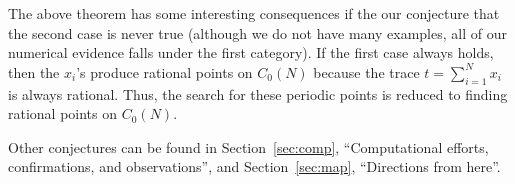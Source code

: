 The above theorem has some interesting consequences if the our conjecture
that the second case is never true (although we do not have many examples,
all of our numerical evidence falls under the first category). If the first
case always holds, then the $x_i$'s produce rational points on $C_0(N)$
because the trace $t = \sum\limits_{i=1}^N x_i$ is always rational. Thus,
the search for these periodic points is reduced to finding rational points
on $C_0(N)$.

Other conjectures can be found in Section~\ref{sec:comp},
``Computational efforts, confirmations, and observations'', and
Section~\ref{sec:map}, ``Directions from here''.

